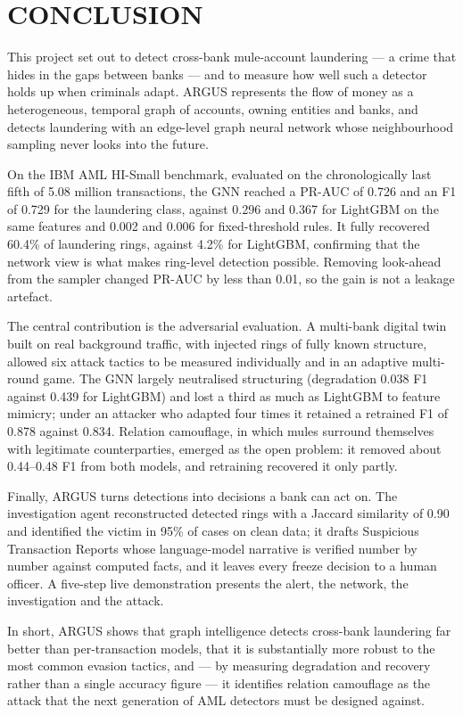 \chapter{CONCLUSION}

This project set out to detect cross-bank mule-account laundering --- a crime that hides in the gaps between banks --- and to measure how well such a detector holds up when criminals adapt. ARGUS represents the flow of money as a heterogeneous, temporal graph of accounts, owning entities and banks, and detects laundering with an edge-level graph neural network whose neighbourhood sampling never looks into the future.

On the IBM AML HI-Small benchmark, evaluated on the chronologically last fifth of 5.08 million transactions, the GNN reached a PR-AUC of 0.726 and an F1 of 0.729 for the laundering class, against 0.296 and 0.367 for LightGBM on the same features and 0.002 and 0.006 for fixed-threshold rules. It fully recovered 60.4\% of laundering rings, against 4.2\% for LightGBM, confirming that the network view is what makes ring-level detection possible. Removing look-ahead from the sampler changed PR-AUC by less than 0.01, so the gain is not a leakage artefact.

The central contribution is the adversarial evaluation. A multi-bank digital twin built on real background traffic, with injected rings of fully known structure, allowed six attack tactics to be measured individually and in an adaptive multi-round game. The GNN largely neutralised structuring (degradation 0.038 F1 against 0.439 for LightGBM) and lost a third as much as LightGBM to feature mimicry; under an attacker who adapted four times it retained a retrained F1 of 0.878 against 0.834. Relation camouflage, in which mules surround themselves with legitimate counterparties, emerged as the open problem: it removed about 0.44--0.48 F1 from both models, and retraining recovered it only partly.

Finally, ARGUS turns detections into decisions a bank can act on. The investigation agent reconstructed detected rings with a Jaccard similarity of 0.90 and identified the victim in 95\% of cases on clean data; it drafts Suspicious Transaction Reports whose language-model narrative is verified number by number against computed facts, and it leaves every freeze decision to a human officer. A five-step live demonstration presents the alert, the network, the investigation and the attack.

In short, ARGUS shows that graph intelligence detects cross-bank laundering far better than per-transaction models, that it is substantially more robust to the most common evasion tactics, and --- by measuring degradation and recovery rather than a single accuracy figure --- it identifies relation camouflage as the attack that the next generation of AML detectors must be designed against.
